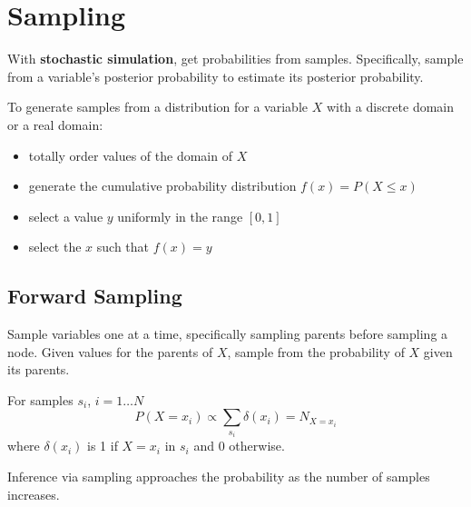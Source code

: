 \documentclass[11pt]{article}
\begin{document}
\section{Sampling}
\label{sec:org13f5ba9}
With \textbf{stochastic simulation}, get probabilities from samples.
Specifically, sample from a variable's posterior probability to estimate its posterior
probability.

To generate samples from a distribution for a variable \(X\) with a discrete domain or a real
domain:
\begin{itemize}
\item totally order values of the domain of \(X\)
\item generate the cumulative probability distribution \(f(x) = P(X \le x)\)
\item select a value \(y\) uniformly in the range \([0, 1]\)
\item select the \(x\) such that \(f(x) = y\)
\end{itemize}
\subsection{Forward Sampling}
\label{sec:org0a7a32d}
Sample variables one at a time, specifically sampling parents before sampling a node.
Given values for the parents of \(X\), sample from the probability of \(X\) given its parents.

For samples \(s_{i}\), \(i = 1 \dots N\)
$$ P(X = x_{i}) \propto \sum_{s_{i}} \delta (x_{i}) = N_{X=x_{i}} $$
where \(\delta(x_{i})\) is 1 if \(X = x_{i}\) in \(s_{i}\) and 0 otherwise.

Inference via sampling approaches the probability as the number of samples increases.
\end{document}
